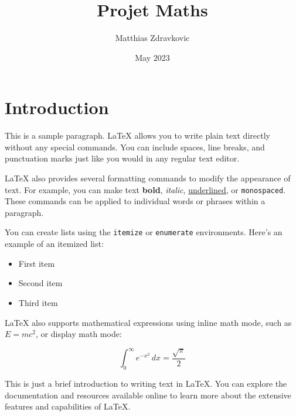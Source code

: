 \documentclass{article}
\title{Projet Maths}
\author{Matthias Zdravkovic}
\date{May 2023}
\begin{document}
\maketitle

\section{Introduction}

This is a sample paragraph. LaTeX allows you to write plain text directly without any special commands. You can include spaces, line breaks, and punctuation marks just like you would in any regular text editor.

LaTeX also provides several formatting commands to modify the appearance of text. For example, you can make text \textbf{bold}, \textit{italic}, \underline{underlined}, or \texttt{monospaced}. These commands can be applied to individual words or phrases within a paragraph.

You can create lists using the \texttt{itemize} or \texttt{enumerate} environments. Here's an example of an itemized list:

\begin{itemize}
    \item First item
    \item Second item
    \item Third item
\end{itemize}

LaTeX also supports mathematical expressions using inline math mode, such as $E = mc^2$, or display math mode:

\[
\int_{0}^{\infty} e^{-x^2} \, dx = \frac{\sqrt{\pi}}{2}
\]

This is just a brief introduction to writing text in LaTeX. You can explore the documentation and resources available online to learn more about the extensive features and capabilities of LaTeX.
\end{document}
